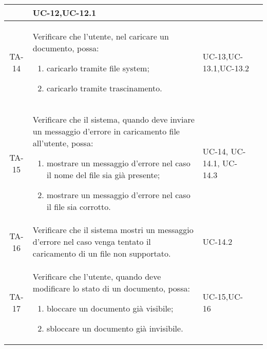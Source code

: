 \begin{xltabular}{\textwidth}{| c | X | X | c |}
\begin{enumerate}
    \end{enumerate}& UC-12,\newline UC-12.1 & \textcolor{cmarkcolor}{} \\
    \hline
    TA-14 & Verificare che l’utente, nel caricare un documento, possa:
    \begin{enumerate}
        \item caricarlo tramite file system;
        \item caricarlo tramite trascinamento.
    \end{enumerate}& UC-13,\newline UC-13.1,\newline UC-13.2 & \textcolor{cmarkcolor}{} \\
    \hline
    TA-15 & Verificare che il sistema, quando deve inviare un messaggio d'errore in caricamento file all'utente, possa:
    \begin{enumerate}
        \item mostrare un messaggio d'errore nel caso il nome del file sia già presente;
        \item mostrare un messaggio d'errore nel caso il file sia corrotto.
        
    \end{enumerate}& UC-14, \newline UC-14.1, \newline UC-14.3 & \textcolor{xmarkcolor}{} \\
    \hline
    TA-16 & Verificare che il sistema mostri un messaggio d'errore nel caso venga tentato il caricamento di un file non supportato.& UC-14.2 & \textcolor{cmarkcolor}{} \\
    \hline

    TA-17 & Verificare che l’utente, quando deve modificare lo stato di un documento, possa:
    \begin{enumerate}
        \item bloccare un documento già visibile;
        \item sbloccare un documento già invisibile.
    \end{enumerate}& UC-15,\newline UC-16 & \textcolor{cmarkcolor}{} \\
    \hline
    

\end{xltabular}
